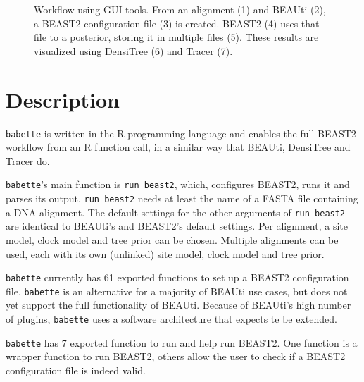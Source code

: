 \documentclass{article}
\begin{document}
\begin{figure}
{
  }
  \caption{
    Workflow using GUI tools. From an alignment (1) and BEAUti (2), 
    a BEAST2 configuration file (3) is created. BEAST2 (4) uses that file
    to a posterior, storing it in multiple files (5). These results
    are visualized using DensiTree (6) and Tracer (7).
  }
  \label{fig:workflow}
\end{figure}

\section{Description}

\verb;babette; is written in the R programming language \cite{R}
and enables the full BEAST2 workflow from an R function call,
in a similar way that BEAUti, DensiTree and Tracer do.

\verb;babette;'s main function is \verb;run_beast2;, which, 
configures BEAST2, runs it and parses its output. 
\verb;run_beast2; needs at least the name of a 
FASTA file containing a DNA alignment. 
The default settings for the other arguments of \verb;run_beast2; 
are identical to BEAUti's and BEAST2's default settings.
Per alignment, a site model, clock model and tree prior can be chosen.
Multiple alignments can be used, each with its own (unlinked) site model, 
clock model and tree prior.

\verb;babette; currently has 61 exported functions to set up  
a BEAST2 configuration file. 
\verb;babette; is an alternative for a majority of BEAUti use cases, 
but does not yet support the full functionality of BEAUti. 
Because of BEAUti's high number of plugins, 
\verb;babette; uses a software architecture that expects te be extended.

\verb;babette; has 7 exported function to run and help run BEAST2.
One function is a wrapper function to run BEAST2, others
allow the user to check if a BEAST2 configuration file is indeed valid.
\end{document}
